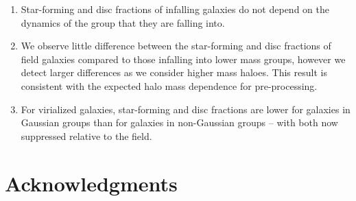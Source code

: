 \documentclass[a4paper,fleqn,usenatbib]{mnras}
\begin{document}
\begin{enumerate}
  \item Star-forming and disc fractions of infalling galaxies do not
    depend on the dynamics of the group that they are falling into.

  \item We observe little difference between the star-forming
    and disc fractions of field galaxies compared to those infalling
    into lower mass groups, however we detect larger differences as we
    consider higher mass haloes.  This result is
    consistent with the expected halo mass dependence for pre-processing.

  \item For virialized galaxies, star-forming and disc fractions are
    lower for galaxies in Gaussian groups than for galaxies in
    non-Gaussian groups -- with both now suppressed relative to the field.
\end{enumerate}


\section*{Acknowledgments}
\label{sec:acknowledgments}
\end{document}
